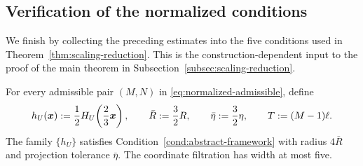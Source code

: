 \subsection{Verification of the normalized conditions}
\label{subsec:verify-normalized}

We finish by collecting the preceding estimates into the five
conditions used in
Theorem~\ref{thm:scaling-reduction}. This is the construction-dependent
input to the proof of the main theorem in
Subsection~\ref{subsec:scaling-reduction}.

\begin{lemma}
\label{lem:normalized-instance}
For every admissible pair $(M,N)$ in
\eqref{eq:normalized-admissible}, define
\[
 h_U(\bm{x}):=\frac12H_U\!\left(\frac23\bm{x}\right),\qquad
 \bar R:=\frac32R,\qquad \bar\eta:=\frac32\eta,
 \qquad T:=(M-1)\ell.
\]
The family $\{h_U\}$ satisfies
Condition~\ref{cond:abstract-framework} with radius $4\bar R$
and projection tolerance $\bar\eta$.
The coordinate filtration has width at most five.
\end{lemma}

